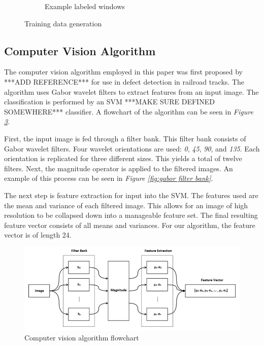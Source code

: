 \documentclass[letterpaper, 10 pt, conference]{ieeeconf}  %
\begin{document}
\begin{figure}
\begin{subfigure}[b]{.32\textwidth}
        \caption{Example labeled windows}
        \vspace*{2mm}
        \label{fig:labeled windows}
    \end{subfigure}
    \caption{Training data generation}
    \label{fig:data generation}
\end{figure}

\subsection{Computer Vision Algorithm}

The computer vision algorithm employed in this paper was first proposed by ***ADD REFERENCE*** for use in defect detection in railroad tracks. The algorithm uses Gabor wavelet filters to extract features from an input image. The classification is performed by an SVM ***MAKE SURE DEFINED SOMEWHERE*** classifier. A flowchart of the algorithm can be seen in \textit{Figure \ref{fig:vision algorithm diagram}}.

First, the input image is fed through a filter bank. This filter bank consists of Gabor wavelet filters. Four wavelet orientations are used: \textit{0\degree}, \textit{45\degree}, \textit{90\degree}, and \textit{135\degree}. Each orientation is replicated for three different sizes. This yields a total of twelve filters. Next, the magnitude operator is applied to the filtered images. An example of this process can be seen in \textit{Figure \ref{fig:gabor filter bank}}.

The next step is feature extraction for input into the SVM. The features used are the mean and variance of each filtered image. This allows for an image of high resolution to be collapsed down into a manageable feature set. The final resulting feature vector consists of all means and variances. For our algorithm, the feature vector is of length 24.

\begin{figure}
    \centering
    \includegraphics[width=.75\textwidth]{computer_vision_diagram.png}
    \caption{Computer vision algorithm flowchart}
    \vspace*{2mm}
    \label{fig:vision algorithm diagram}
\end{figure}
\end{document}
